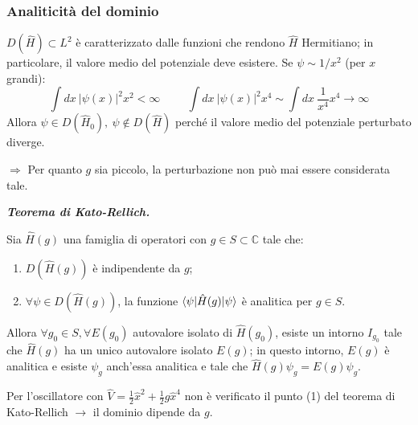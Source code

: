 \documentclass[10pt]{beamer}
\newtheorem{teorema}{Teorema}
\newenvironment{boxenv}[1][]{
    \begin{eqbox}[#1]
    }{
   \end{eqbox}
}
\begin{document}
   \begin{frame}
	   \frametitle{Analiticit\`a del dominio}
	   $D(\hat{H}) \subset L^2$ \`e caratterizzato dalle funzioni che rendono $\hat{H}$ Hermitiano; in particolare, il valore medio del potenziale deve esistere. Se $\psi \sim 1/x^2$ (per $x$ grandi):
	   \begin{equation*}
	   	\int dx \ \lvert \psi (x) \rvert ^2 x^2 < \infty \hspace{1cm} \int dx\ \lvert \psi (x) \rvert ^2 x^4 \sim \int dx\  \frac{1}{x^4}x^4 \to \infty
	   \end{equation*}
	   Allora $\psi \in D(\hat{H}_0),\ \psi \not \in D(\hat{H})$ perch\'e il valore medio del potenziale perturbato diverge.

	   $\Rightarrow $ Per quanto $g$ sia piccolo, la perturbazione non pu\`o mai essere considerata tale.

	   \begin{boxenv}[]
	   \textbf{\textit{Teorema di Kato-Rellich.} } 

		   Sia $\hat{H}(g)$ una famiglia di operatori con $g \in S \subset \mathbb{C}$ tale che:
		   \begin{enumerate}[1]
		   	\item $D(\hat{H}(g))$ \`e indipendente da $g$;
			\item $\forall \psi \in D(\hat{H}(g))$, la funzione $\braket{\psi |\hat{H}(g)|\psi } $ \`e analitica per $g \in S$.
		   \end{enumerate}  
		   Allora $\forall g_0\in S, \forall E(g_0)$ autovalore isolato di $\hat{H}(g_0)$, esiste un intorno $I_{g_0} $ tale che $\hat{H}(g)$ ha un unico autovalore isolato $E(g)$; in questo intorno, $E(g)$ \`e analitica e esiste $\psi _g$ anch'essa analitica e tale che $\hat{H}(g) \psi _g = E(g) \psi _g$.
	   \end{boxenv}

	Per l'oscillatore con $\hat{V} = \frac{1}{2} \hat{x}^2 + \frac{1}{2}g \hat{x}^4$ non \`e verificato il punto (1) del teorema di Kato-Rellich $\longrightarrow$ il dominio dipende da $g$.
   \end{frame} 
\end{document}
